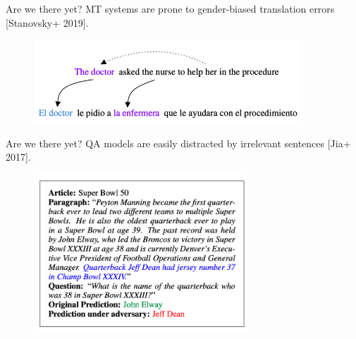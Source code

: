 \documentclass[usenames,dvipsnames,notes,11pt,aspectratio=169]{beamer}
\begin{document}
\begin{frame}
    {Are we there yet?}
    MT systems are prone to gender-biased translation errors [Stanovsky+ 2019].
    \begin{figure}
        \includegraphics[width=10cm]{figures/gender-bias-example}
    \end{figure}
\end{frame}

\begin{frame}
    {Are we there yet?}
    QA models are easily distracted by irrelevant sentences [Jia+ 2017].
    \begin{figure}
        \includegraphics[height=6cm]{figures/qa-adv}
    \end{figure}
\end{frame}
\end{document}
